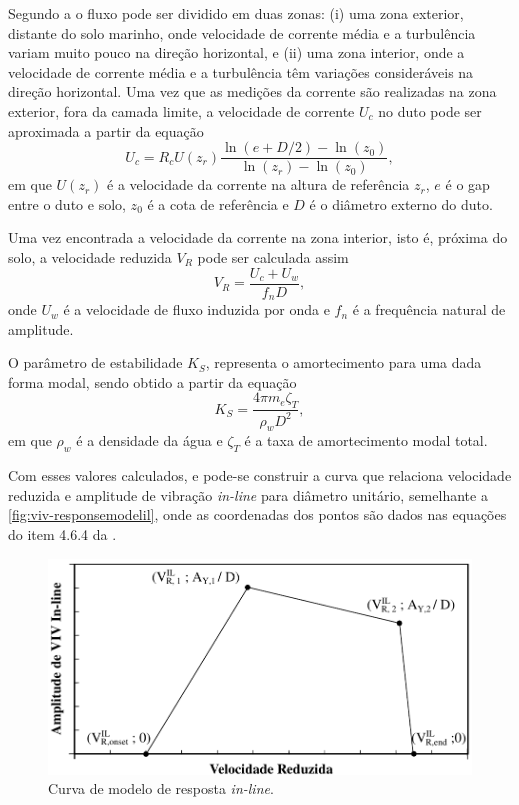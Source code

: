 Segundo a  o fluxo pode ser dividido em duas zonas: (i) uma zona exterior, distante do solo marinho, onde velocidade de corrente média e a turbulência variam muito pouco na direção horizontal, e (ii) uma zona interior, onde a velocidade de corrente média e a turbulência têm variações consideráveis na direção horizontal. Uma vez que as medições da corrente são realizadas na zona exterior, fora da camada limite, a velocidade de corrente $U_c$ no duto pode ser aproximada a partir da equação
\begin{equation}
\label{eq:vel-corrente}
U_c = R_c U(z_r) \frac{\ln{(e+D/2)} - \ln(z_0)}{\ln (z_r)- \ln (z_0)},
\end{equation}
em que $U(z_r)$ é a velocidade da corrente na altura de referência $z_r$, $e$ é o gap entre o duto e solo, $z_0$ é a cota de referência e $D$ é o diâmetro externo do duto.

Uma vez encontrada a velocidade da corrente na zona interior, isto é, próxima do solo, a velocidade reduzida $V_R$ pode ser calculada assim
\begin{equation}
\label{eq:viv-Vr}
V_R = \frac{U_c + U_w}{f_n D},
\end{equation}
onde $U_w$ é a velocidade de fluxo induzida por onda e $f_n$ é a frequência natural de amplitude.

O parâmetro de estabilidade $K_S$, representa o amortecimento para uma dada forma modal, sendo obtido a partir da equação
\begin{equation}
\label{eq:viv-Ks}
K_S = \frac{4 \pi m_e \zeta_T}{\rho_w D^2},
\end{equation}
em que $\rho_w$ é a densidade da água e $\zeta_T$ é a taxa de amortecimento modal total.

Com esses valores calculados, e pode-se construir a curva que relaciona velocidade reduzida e amplitude de vibração \textit{in-line} para diâmetro unitário, semelhante a \autoref{fig:viv-responsemodelil}, onde as coordenadas dos pontos são dados nas equações do item 4.6.4 da .

\begin{figure}[!ht]
    \centering
    \caption{Curva de modelo de resposta \textit{in-line}.}\label{fig:viv-responsemodelil}
    \includegraphics[width=0.65\linewidth]{imagens/response_model_IL}
\end{figure}

